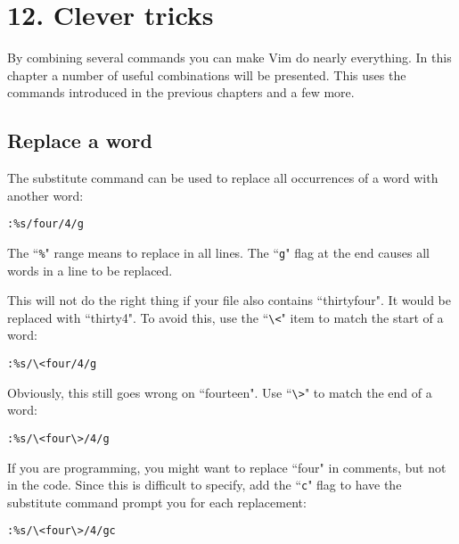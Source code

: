\section{12. Clever tricks}
By combining several commands you can make Vim do nearly everything.  In this
chapter a number of useful combinations will be presented.  This uses the
commands introduced in the previous chapters and a few more.
\localtableofcontents
\subsection{Replace a word}
The substitute command can be used to replace all occurrences of a word with another word:

\begin{Verbatim}[samepage=true]
 :%s/four/4/g
\end{Verbatim}

The ``\texttt{\%}" range means to replace in all lines.
The ``\texttt{g}" flag at the end causes all words in a line to be replaced.

This will not do the right thing if your file also contains ``thirtyfour".
It would be replaced with ``thirty4".
To avoid this, use the ``\texttt{\textbackslash{}<}" item to match the start of a word:

\begin{Verbatim}[samepage=true]
 :%s/\<four/4/g
\end{Verbatim}

Obviously, this still goes wrong on ``fourteen".  Use ``\texttt{\textbackslash{}>}" to match the end of
a word:

\begin{Verbatim}[samepage=true]
 :%s/\<four\>/4/g
\end{Verbatim}

If you are programming, you might want to replace ``four" in comments, but not in the code.
Since this is difficult to specify, add the ``\texttt{c}" flag to have the substitute command prompt you for each replacement:

\begin{Verbatim}[samepage=true]
 :%s/\<four\>/4/gc
\end{Verbatim}

